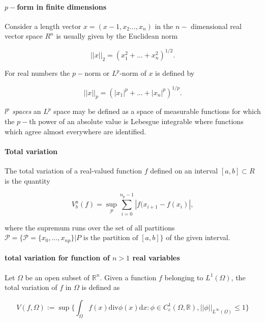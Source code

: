\paragraph{$p-$form in finite dimensions}


Consider a length vector $x=(x-1, x_2...,x_n)$ in the $n-$ dimensional real vector space $R^n$ is usually given by the Euclidean norm 

\begin{equation}
||x||_2 = (x_1 ^2 + ... + x_n ^2)^{1/2}.
\end{equation}

For real numbers the $p-$norm or $L^p$-norm of $x$ is defined by

\begin{equation}
||x||_p = (|x_1|^p + ... + |x_n|^p)^{1/p}.
\end{equation}

\textit{$l^p$ spaces}
an $L^p$ space may be defined as a space of measurable functions for which the $p-$th power of an absolute value is Lebesgue integrable where functions which agree almost everywhere are identified.


\paragraph{Total variation}


The total variation of a real-valued function $f$ defined on an interval $[a,b]\subset R$ is the quantity 

\begin{equation}
V_b ^a (f) = \sup_{\mathcal{P}}\sum_{i=0}^{n_p -1}|f(x_{i+1} - f(x_i)|,
\end{equation}

where the supremum runs over the set of all partitions $\mathcal{P} = \{\mathcal{P}=\{x_0,...,x_{np}\}|P\text{ is the partition of }[a,b]\}$ of the given interval. 


\paragraph{total variation for function of $n>1$ real variables}


Let $\Omega$ be an open subset of $\mathbb{R}^n$. 
Given a function $f$ belonging to $L^1(\Omega)$, the total variation of $f$ in $\Omega$ is defined as 

\begin{equation}
V(f,\Omega):=\sup\Bigg\{\int_{\Omega}f(x)\text{div}\phi(x)\text{d}x:\phi\in C_{c}^1(\Omega, \mathbb{R}), ||\phi||_{L^{\infty}(\Omega)}\leq 1\Bigg\}
\end{equation}

